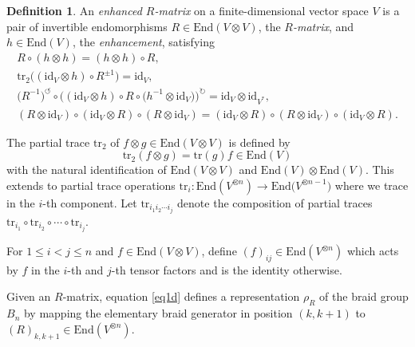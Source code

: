\documentclass[10pt,a4paper]{amsart}
\numberwithin{equation}{section}
\theoremstyle{definition}
\newtheorem{Definition}[Theorem]{Definition}
\begin{document}
\begin{Definition}
\label{def.Rh}
An \emph{enhanced $R$-matrix} on a finite-dimensional vector space $V$
is a pair of invertible endomorphisms $R \in \mathrm{End}(V\otimes V)$,
the \emph{$R$-matrix}, and $h \in \mathrm{End}(V)$, the \emph{enhancement}, satisfying
\begin{subequations}\label{eq1}
\begin{gather}
\label{eq1a}
R \circ (h \otimes h) = (h \otimes h) \circ R, \\
\label{eq1b}
\mathrm{tr}_{2} \bigl((\mathrm{id}_V \otimes h) \circ R^{\pm 1}\bigr) = \mathrm{id}_V, \\
\label{eq1c}
\bigl(R^{-1}\bigr)^{\circlearrowleft} \circ \bigl((\mathrm{id}_V \otimes h)
\circ R \circ \bigl(h^{-1} \otimes \mathrm{id}_V\bigr)\bigr)^{\circlearrowright} =
\mathrm{id}_V \otimes \mathrm{id}_{V^{\ast}}, \\
\label{eq1d}
(R \otimes \mathrm{id}_V) \circ (\mathrm{id}_V \otimes R)
\circ (R \otimes \mathrm{id}_V) = (\mathrm{id}_V \otimes R)
\circ (R \otimes \mathrm{id}_V) \circ (\mathrm{id}_V \otimes R).
\end{gather}
\end{subequations}
\end{Definition}

The partial trace $\mathrm{tr}_2$ of $f \otimes g \in \mathrm{End}(V \otimes V)$
is defined by
\begin{equation}
\label{tr2}
\mathrm{tr}_{2}(f \otimes g) = \mathrm{tr}(g) f \in \mathrm{End}(V)
\end{equation}
with the natural identification of $\mathrm{End}(V \otimes V)$ and
$\mathrm{End}(V) \otimes \mathrm{End}(V)$. {This extends to partial trace operations
$\mathrm{tr}_i\colon \mathrm{End}(V^{\otimes n})\to \mathrm{End}\bigl(V^{\otimes n-1}\bigr)$ where we trace in the $i$-th
component. Let $\mathrm{tr}_{i_1i_2\cdots i_j}$ denote the composition of partial traces
$\mathrm{tr}_{i_1}\circ\mathrm{tr}_{i_2}\circ\cdots\circ\mathrm{tr}_{i_j}$.}

For $1\leq i <j \leq n$ and $f\in\mathrm{End}(V\otimes V)$, define
$(f)_{ij}\in\mathrm{End}(V^{\otimes n})$ which acts by $f$ in the $i$-th and $j$-th
tensor factors and is the identity otherwise.

Given an $R$-matrix, equation \eqref{eq1d} defines a representation $\rho_R$ of
the braid group $B_n$ by mapping the elementary braid
generator in position $(k, k+1)$ to $(R)_{k,k+1}\in \mathrm{End}(V^{\otimes n})$.
\end{document}
